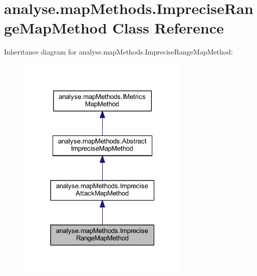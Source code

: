\hypertarget{classanalyse_1_1map_methods_1_1_imprecise_range_map_method}{}\section{analyse.\+map\+Methods.\+Imprecise\+Range\+Map\+Method Class Reference}
\label{classanalyse_1_1map_methods_1_1_imprecise_range_map_method}


Inheritance diagram for analyse.\+map\+Methods.\+Imprecise\+Range\+Map\+Method\+:
\nopagebreak
\begin{figure}[H]
\begin{center}
\leavevmode
\includegraphics[width=235pt]{classanalyse_1_1map_methods_1_1_imprecise_range_map_method__inherit__graph}
\end{center}
\end{figure}


